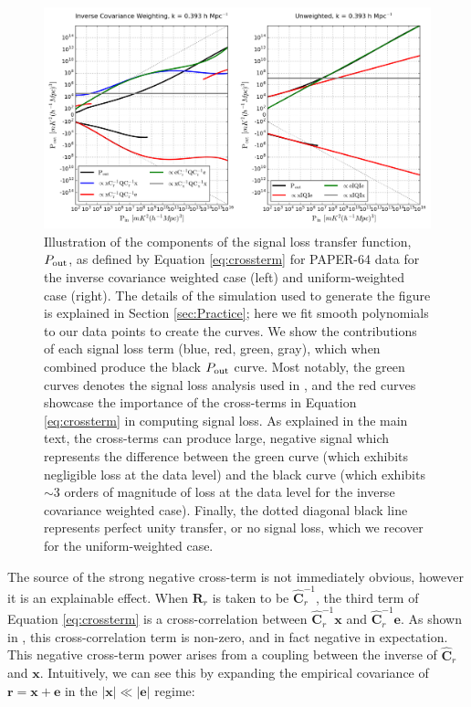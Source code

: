 \documentclass[preprint2,numberedappendix,tighten]{aastex6}  %
\begin{document}
\begin{figure}
	\centering
	\includegraphics[width=1\textwidth]{plots/sigloss_terms.png}
	\caption{Illustration of the components of the signal loss transfer function, $P_{\rm out}$, as defined by Equation \eqref{eq:crossterm} for PAPER-64 data for the inverse covariance weighted case (left) and uniform-weighted case (right). The details of the simulation used to generate the figure is explained in Section \ref{sec:Practice}; here we fit smooth polynomials to our data points to create the curves. We show the contributions of each signal loss term (blue, red, green, gray), which when combined produce the black $P_{\rm out}$ curve. Most notably, the green curves denotes the signal loss analysis used in , and the red curves showcase the importance of the cross-terms in Equation \eqref{eq:crossterm} in computing signal loss. As explained in the main text, the cross-terms can produce large, negative signal which represents the difference between the green curve (which exhibits negligible loss at the data level) and the black curve (which exhibits $\sim$$3$ orders of magnitude of loss at the data level for the inverse covariance weighted case). Finally, the dotted diagonal black line represents perfect unity transfer, or no signal loss, which we recover for the uniform-weighted case.}
	\label{fig:sigloss_terms}
\end{figure}

The source of the strong negative cross-term is not immediately obvious, however it is an explainable effect. 
When $\textbf{R}_{r}$
is taken to be $\widehat{\textbf{C}}_{r}^{-1}$, the third term of Equation \eqref{eq:crossterm} is a cross-correlation between $\widehat{\textbf{C}}_{r}^{-1}\textbf{x}$ and
$\widehat{\textbf{C}}_{r}^{-1}\textbf{e}$. As shown in \citet{switzer_et_al2015}, this cross-correlation term is non-zero, and in fact negative in expectation. 
This negative cross-term power arises from a coupling between the inverse of 
$\widehat{\textbf{C}}_{r}$ and $\mathbf{x}$. 
Intuitively, we can see this by expanding the empirical covariance of $\textbf{r}=\textbf{x}+\textbf{e}$ in the
$|\textbf{x}|\ll|\textbf{e}|$ regime:
\end{document}

